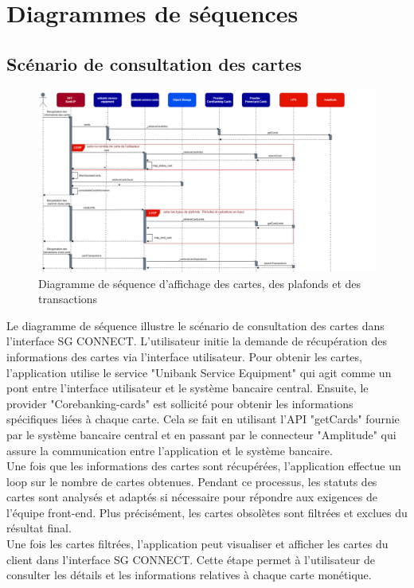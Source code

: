 \section{Diagrammes de séquences}
\subsection{Scénario de consultation des cartes}
\begin{figure}[!h]
    \centering %
        \includegraphics[width=14cm]{images/conception/sequence_cards2.png}
    \caption{Diagramme de séquence d'affichage des cartes, des plafonds et des transactions}
\end{figure}
 
Le diagramme de séquence illustre le scénario de consultation des cartes dans l'interface SG CONNECT. L'utilisateur initie la demande de récupération des informations des cartes via l'interface utilisateur. Pour obtenir les cartes, l'application utilise le service "Unibank Service Equipment" qui agit comme un pont entre l'interface utilisateur et le système bancaire central. Ensuite, le provider "Corebanking-cards" est sollicité pour obtenir les informations spécifiques liées à chaque carte. Cela se fait en utilisant l'API "getCards" fournie par le système bancaire central et en passant par le connecteur "Amplitude" qui assure la communication entre l'application et le système bancaire.\\
Une fois que les informations des cartes sont récupérées, l'application effectue un loop sur le nombre de cartes obtenues. Pendant ce processus, les statuts des cartes sont analysés et adaptés si nécessaire pour répondre aux exigences de l'équipe front-end. Plus précisément, les cartes obsolètes sont filtrées et exclues du résultat final.\\
Une fois les cartes filtrées, l'application peut visualiser et afficher les cartes du client dans l'interface SG CONNECT. Cette étape permet à l'utilisateur de consulter les détails et les informations relatives à chaque carte monétique.\\

